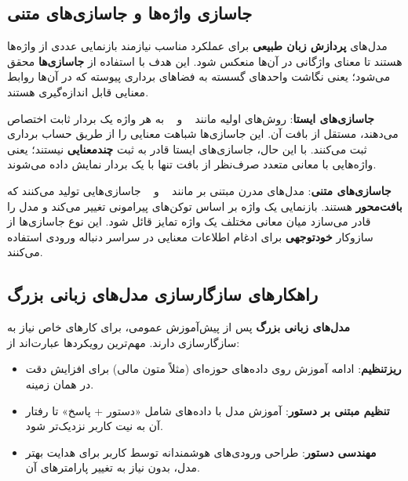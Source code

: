 \documentclass[12pt, a4paper]{report}
\begin{document}
\subsection{جاسازی واژه‌ها\protect{} و جاسازی‌های متنی\protect{}}

مدل‌های \textbf{پردازش زبان طبیعی} برای عملکرد مناسب نیازمند بازنمایی عددی از واژه‌ها هستند تا معنای واژگانی در آن‌ها منعکس شود. این هدف با استفاده از \textbf{جاسازی‌ها} محقق می‌شود؛ یعنی نگاشت واحدهای گسسته به فضاهای برداری پیوسته که در آن‌ها روابط معنایی قابل اندازه‌گیری هستند.  

\bigskip
\textbf{جاسازی‌های ایستا}:  
روش‌های اولیه مانند ~\cite{mikolov2013efficient} و ~\cite{pennington2014glove} به هر واژه یک بردار ثابت اختصاص می‌دهند، مستقل از بافت آن. این جاسازی‌ها شباهت معنایی را از طریق حساب برداری ثبت می‌کنند. با این حال، جاسازی‌های ایستا قادر به ثبت \textbf{چندمعنایی} نیستند؛ یعنی واژه‌هایی با معانی متعدد صرف‌نظر از بافت تنها با یک بردار نمایش داده می‌شوند.  

\bigskip
\textbf{جاسازی‌های متنی}:  
مدل‌های مدرن مبتنی بر  مانند ~\cite{devlin2019bert} و ~\cite{radford2019language} جاسازی‌هایی تولید می‌کنند که \textbf{بافت‌محور} هستند. بازنمایی یک واژه بر اساس توکن‌های پیرامونی تغییر می‌کند و مدل را قادر می‌سازد میان معانی مختلف یک واژه تمایز قائل شود. این نوع جاسازی‌ها از سازوکار \textbf{خودتوجهی} برای ادغام اطلاعات معنایی در سراسر دنباله ورودی استفاده می‌کنند.  


\subsection{راهکارهای سازگار‌سازی مدل‌های زبانی بزرگ}

\textbf{مدل‌های زبانی بزرگ} پس از پیش‌آموزش عمومی، برای کارهای خاص نیاز به سازگار‌سازی دارند. مهم‌ترین رویکردها عبارت‌اند از:  

\begin{itemize}
    \item \textbf{ریزتنظیم}: ادامه آموزش روی داده‌های حوزه‌ای (مثلاً متون مالی) برای افزایش دقت در همان زمینه.  
    \item \textbf{تنظیم مبتنی بر دستور}: آموزش مدل با داده‌های شامل «دستور + پاسخ» تا رفتار آن به نیت کاربر نزدیک‌تر شود.  
    \item \textbf{مهندسی دستور}: طراحی ورودی‌های هوشمندانه توسط کاربر برای هدایت بهتر مدل، بدون نیاز به تغییر پارامترهای آن.  
\end{itemize}
\end{document}
